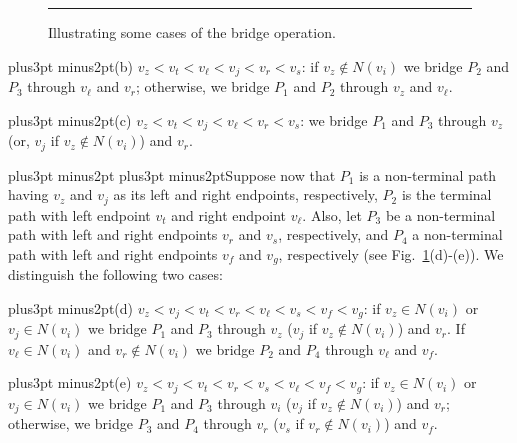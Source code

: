 \documentclass[10pt]{article}
\def\yskip{\penalty-50\vskip3pt plus3pt minus2pt}
\def\y{\yskip}
\def\yy{\yskip\yskip}
\begin{document}
{\begin{figure}[t]
    \caption{\small{Illustrating some cases of the bridge operation.}}
\bigskip \hrule
 \label{bridgeOP}
\end{figure}


\y\noindent (b) $v_z<v_t<v_\ell<v_j<v_r<v_s$: if $v_z \notin
N(v_i)$ we bridge $P_2$ and $P_3$ through $v_\ell$ and $v_r$;
otherwise, we \phantom{(b)} bridge $P_1$ and $P_2$ through $v_z$
and $v_\ell$.

\y \noindent (c) $v_z<v_t<v_j<v_\ell<v_r<v_s$: we bridge $P_1$ and
$P_3$ through $v_z$ (or, $v_j$ if $v_z \notin N(v_i)$) and $v_r$.


\yy Suppose now that $P_1$ is a non-terminal path having $v_z$ and
$v_j$ as its left and right endpoints, respectively, $P_2$ is the
terminal path with left endpoint $v_t$ and right endpoint
$v_\ell$. Also, let $P_3$ be a non-terminal path with left and
right endpoints $v_r$ and $v_s$, respectively, and $P_4$ a
non-terminal path with left and right endpoints $v_f$ and $v_g$,
respectively (see Fig.~\ref{bridgeOP}(d)-(e)). We distinguish the
following two cases:

\y \noindent (d) $v_z<v_j<v_t<v_r<v_\ell<v_s<v_f<v_g$: if $v_z \in
N(v_i)$ or $v_j \in N(v_i)$ we bridge $P_1$ and $P_3$ through
\phantom{(d)} $v_z$ ($v_j$ if $v_z \notin N(v_i)$) and $v_r$. If
$v_\ell \in N(v_i)$ and $v_r \notin N(v_i)$ we bridge $P_2$ and
$P_4$ through $v_\ell$ and $v_f$.

\y \noindent (e) $v_z<v_j<v_t<v_r<v_s<v_\ell<v_f<v_g$: if $v_z \in
N(v_i)$ or $v_j \in N(v_i)$ we bridge $P_1$ and $P_3$ through
\phantom{(e)} $v_i$ ($v_j$ if $v_z \notin N(v_i)$) and $v_r$;
otherwise, we bridge $P_3$ and $P_4$ through $v_r$ ($v_s$ if $v_r
\notin N(v_i)$) and $v_f$.



}
\end{document}
